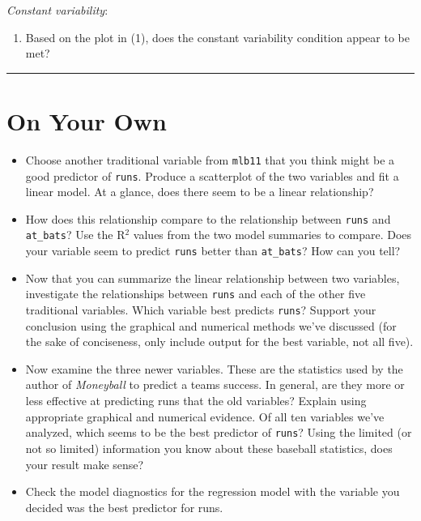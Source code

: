 \documentclass[]{book}
\providecommand{\tightlist}{%
  \setlength{\itemsep}{0pt}\setlength{\parskip}{0pt}}
\theoremstyle{definition}
\theoremstyle{definition}
\theoremstyle{remark}
\begin{document}
\emph{Constant variability}:

\begin{enumerate}
\def\labelenumi{\arabic{enumi}.}
\setcounter{enumi}{7}
\tightlist
\item
  Based on the plot in (1), does the constant variability condition
  appear to be met?
\end{enumerate}

\begin{center}\rule{0.5\linewidth}{\linethickness}\end{center}

\section*{On Your Own}\label{on-your-own-6}

\begin{itemize}
\item
  Choose another traditional variable from \texttt{mlb11} that you think
  might be a good predictor of \texttt{runs}. Produce a scatterplot of
  the two variables and fit a linear model. At a glance, does there seem
  to be a linear relationship?
\item
  How does this relationship compare to the relationship between
  \texttt{runs} and \texttt{at\_bats}? Use the R\(^2\) values from the
  two model summaries to compare. Does your variable seem to predict
  \texttt{runs} better than \texttt{at\_bats}? How can you tell?
\item
  Now that you can summarize the linear relationship between two
  variables, investigate the relationships between \texttt{runs} and
  each of the other five traditional variables. Which variable best
  predicts \texttt{runs}? Support your conclusion using the graphical
  and numerical methods we've discussed (for the sake of conciseness,
  only include output for the best variable, not all five).
\item
  Now examine the three newer variables. These are the statistics used
  by the author of \emph{Moneyball} to predict a teams success. In
  general, are they more or less effective at predicting runs that the
  old variables? Explain using appropriate graphical and numerical
  evidence. Of all ten variables we've analyzed, which seems to be the
  best predictor of \texttt{runs}? Using the limited (or not so limited)
  information you know about these baseball statistics, does your result
  make sense?
\item
  Check the model diagnostics for the regression model with the variable
  you decided was the best predictor for runs.
\end{itemize}
\end{document}
